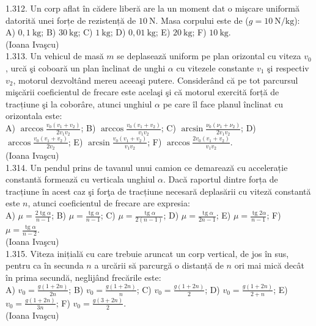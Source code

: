 {1.312. Un corp aflat în cădere liberă are la un moment dat o mişcare uniformă datorită unei forțe de rezistență de $10 \mathrm{~N}$. Masa corpului este de ($g=10 \mathrm{~N} / \mathrm{kg}$):\\ A) $0,1 \mathrm{~kg}$; B) $30 \mathrm{~kg}$; C) $1 \mathrm{~kg}$; D) $0,01 \mathrm{~kg}$; E) $20 \mathrm{~kg}$; F) $10 \mathrm{~kg}$.\\ (Ioana Ivaşcu)\\

1.313. Un vehicul de masă $m$ se deplasează uniform pe plan orizontal cu viteza $v_{0}$, urcă şi coboară un plan înclinat de unghi $\alpha$ cu vitezele constante $v_{1}$ şi respectiv $v_{2}$, motorul dezvoltând mereu aceeaşi putere. Considerând că pe tot parcursul mişcării coeficientul de frecare este acelaşi şi că motorul exercită forță de tracțiune şi la coborâre, atunci unghiul $\alpha$ pe care îl face planul înclinat cu orizontala este:\\ A) $\arccos \frac{v_{0}\left(v_{1}+v_{2}\right)}{2 v_{1} v_{2}}$; B) $\arccos \frac{v_{0}\left(v_{1}+v_{2}\right)}{v_{1} v_{2}}$; C) $\arcsin \frac{\nu_{0}\left(\nu_{1}+\nu_{2}\right)}{2 v_{1} v_{2}}$; D) $\arccos \frac{v_{0}\left(v_{1}+v_{2}\right)}{2 v_{2}}$; E) $\arcsin \frac{v_{0}\left(v_{1}+v_{2}\right)}{v_{1} v_{2}}$; F) $\arccos \frac{2 v_{0}\left(v_{1}+v_{2}\right)}{v_{1} v_{2}}$.\\ (Ioana Ivaşcu)\\

1.314. Un pendul prins de tavanul unui camion ce demarează cu accelerație constantă formează cu verticala unghiul $\alpha$. Dacă raportul dintre forța de tracțiune în acest caz şi forţa de tracțiune necesară deplasării cu viteză constantă este $n$, atunci coeficientul de frecare are expresia:\\ A) $\mu=\frac{2 \operatorname{tg} \alpha}{n-1}$; B) $\mu=\frac{\operatorname{tg} \alpha}{n-1}$; C) $\mu=\frac{\operatorname{tg} \alpha}{2(n-1)}$; D) $\mu=\frac{\operatorname{tg} \alpha}{2 n-1}$; E) $\mu=\frac{\operatorname{tg} 2 \alpha}{n-1}$; F) $\mu=\frac{\operatorname{tg} \alpha}{n-2}$.\\ (Ioana Ivaşcu)\\

1.315. Viteza inițială cu care trebuie aruncat un corp vertical, de jos în sus, pentru ca în secunda $n$ a urcării să parcurgă o distanță de $n$ ori mai mică decât în prima secundă, neglijând frecările este:\\ A) $v_{0}=\frac{g(1+2 n)}{2 n}$; B) $v_{0}=\frac{g(1+2 n)}{n}$; C) $v_{0}=\frac{g(1+2 n)}{2}$; D) $v_{0}=\frac{g(1+2 n)}{2+n}$; E) $v_{0}=\frac{g(1+2 n)}{3 n}$; F) $v_{0}=\frac{g(3+2 n)}{2}$.\\ (Ioana Ivaşcu)\\

}
